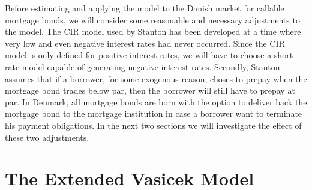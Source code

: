\documentclass[12pt,twoside]{reedthesis}
\begin{document}
Before estimating and applying the model to the Danish market for callable mortgage bonds, we will consider some reasonable and necessary adjustments to the model. The CIR model used by Stanton has been developed at a time where very low and even negative interest rates had never occurred. Since the CIR model is only defined for positive interest rates, we will have to choose a short rate model capable of generating negative interest rates. Secondly, Stanton assumes that if a borrower, for some exogenous reason, choses to prepay when the mortgage bond trades below par, then the borrower will still have to prepay at par. In Denmark, all mortgage bonds are born with the option to deliver back the mortgage bond to the mortgage institution in case a borrower want to terminate his payment obligations. In the next two sections we will investigate the effect of these two adjustments.

\hypertarget{the-extended-vasicek-model}{%
\section{The Extended Vasicek Model}\label{the-extended-vasicek-model}}
\end{document}

